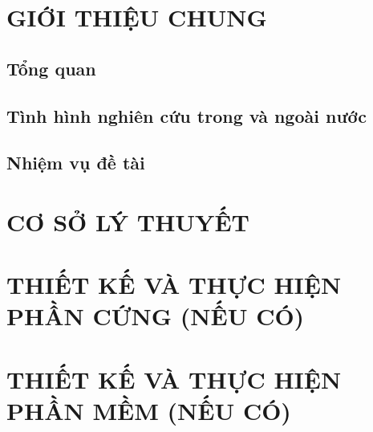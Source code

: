 \documentclass[12pt, a4paper, oneside]{article}
\begin{document}
\section{GIỚI THIỆU CHUNG}
\label{sec:gioi_thieu_chung}
\subsection{Tổng quan}

\subsection{Tình hình nghiên cứu trong và ngoài nước}

\subsection{Nhiệm vụ đề tài}



\newpage
\section{CƠ SỞ LÝ THUYẾT}
\label{sec:co_so_ly_thuyet}



\newpage
\section{THIẾT KẾ VÀ THỰC HIỆN PHẦN CỨNG (NẾU CÓ)}
\label{sec:thiet_ke_thuc_hien_phan_cung}




\newpage
\section{THIẾT KẾ VÀ THỰC HIỆN PHẦN MỀM (NẾU CÓ)}
\label{sec:thiet_ke_thuc_hien_phan_mem}
\end{document}
